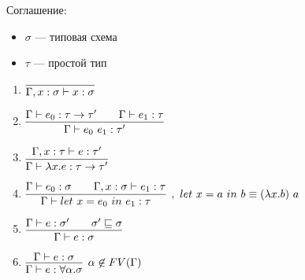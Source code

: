 Соглашение:
\begin{itemize}
    \item $\sigma$ --- типовая схема
    \item $\tau$ --- простой тип
\end{itemize}


\begin{enumerate}
    \item $\vcenter{\infer{\Gamma, x : \sigma \vdash x : \sigma}{}}$
    \item $\vcenter{\infer{\Gamma \vdash e_0\ e_1 : \tau'}{\Gamma \vdash e_0 : \tau \rightarrow \tau' \qquad \Gamma \vdash e_1 : \tau}}$
    \item $\vcenter{\infer{\Gamma \vdash \lambda x.e : \tau \rightarrow \tau'}{\Gamma, x : \tau \vdash e : \tau'}}$
    \item $\vcenter{\infer[,\ let\ x = a\ in\ b \equiv (\lambda x.b)\ a]{\Gamma \vdash let\ x = e_0\ in\ e_1 : \tau}{\Gamma \vdash e_0 : \sigma \qquad \Gamma, x : \sigma \vdash e_1 : \tau}}$
    \item $\vcenter{\infer{\Gamma \vdash e : \sigma}{\Gamma \vdash e : \sigma' \qquad  \sigma' \sqsubseteq \sigma}}$
    \item $\vcenter{\infer[\alpha \not \in FV(\Gamma)]{\Gamma \vdash e : \forall \alpha.\sigma}{\Gamma \vdash e : \sigma}}$
\end{enumerate}


